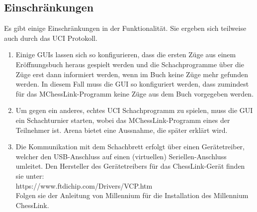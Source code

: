 \documentclass[11pt,a4paper]{article}
\begin{document}
\subsection{Einschränkungen}

Es gibt einige Einschränkungen in der Funktionalität. Sie ergeben sich teilweise auch durch das UCI Protokoll.

\begin{enumerate}
	\item Einige GUIs lassen sich so konfigurieren, dass die ersten Züge aus einem Eröffnungsbuch heraus gespielt werden und die Schachprogramme über die Züge erst dann informiert werden, wenn im Buch keine Züge mehr gefunden werden. In diesem Fall muss die GUI so konfiguriert werden, dass zumindest für das MChessLink-Programm keine Züge aus dem Buch vorgegeben werden.
	\item Um gegen ein anderes, echtes UCI Schachprogramm zu spielen, muss die GUI ein Schachturnier starten, wobei das MChessLink-Programm eines der Teilnehmer ist. Arena bietet eine Aussnahme, die später erklärt wird.
	\item Die Kommunikation mit dem Schachbrett erfolgt über einen Gerätetreiber, welcher den USB-Anschluss auf einen (virtuellen) Seriellen-Anschluss umleitet.  Den Hersteller des Gerätetreibers für das ChessLink-Gerät finden sie unter: \\ https://www.ftdichip.com/Drivers/VCP.htm
	\\Folgen sie der Anleitung von Millennium für die Installation des Millennium ChessLink.
\end{enumerate}

\pagebreak
\end{document}
